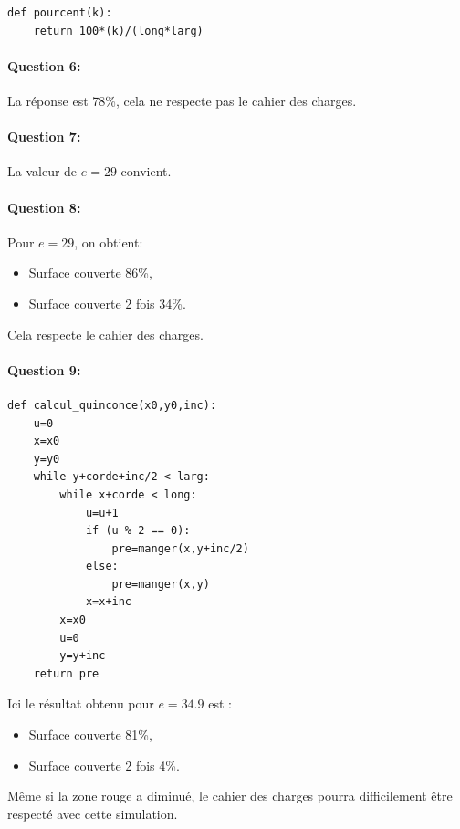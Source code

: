 \begin{solution}
\begin{verbatim}
def pourcent(k):
    return 100*(k)/(long*larg)
\end{verbatim}

\paragraph{Question 6:} La réponse est 78\%, cela ne respecte pas le cahier des charges.

\paragraph{Question 7:} La valeur de $e=29$ convient.

\paragraph{Question 8:} Pour $e=29$, on obtient:
\begin{itemize}
 \item Surface couverte 86\%,
 \item Surface couverte 2 fois 34\%.
\end{itemize}

Cela respecte le cahier des charges.

\paragraph{Question 9:}

\begin{verbatim}
def calcul_quinconce(x0,y0,inc):
    u=0
    x=x0
    y=y0
    while y+corde+inc/2 < larg:
        while x+corde < long:
            u=u+1
            if (u % 2 == 0):
                pre=manger(x,y+inc/2)
            else:
                pre=manger(x,y)
            x=x+inc
        x=x0
        u=0
        y=y+inc
    return pre
\end{verbatim}

Ici le résultat obtenu pour $e=34.9$ est :
\begin{itemize}
 \item Surface couverte 81\%,
 \item Surface couverte 2 fois 4\%.
\end{itemize}

Même si la zone \og rouge \fg a diminué, le cahier des charges pourra difficilement être respecté avec cette simulation.
\end{solution}


